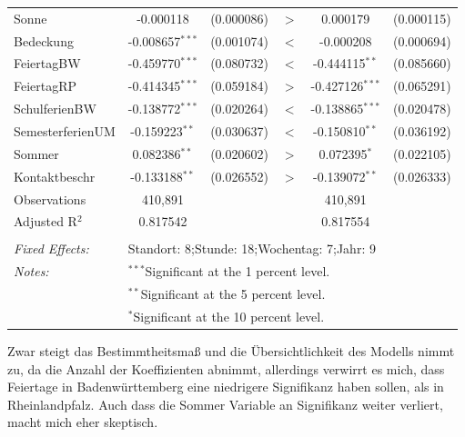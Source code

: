 \documentclass[a4paper,12pt]{thesis}
\begin{document}
\begin{table}[!htbp]
\begin{tabular}{@{\extracolsep{-5pt}}lccccc}
		Sonne & -0.000118 & (0.000086) & $>$ & 0.000179 & (0.000115)\\ 
		
		Bedeckung & -0.008657$^{***}$ & (0.001074) & $<$ & -0.000208 & (0.000694)\\ 
		
		FeiertagBW & -0.459770$^{***}$ & (0.080732) & $<$ & -0.444115$^{**}$ & (0.085660)\\ 
		
		FeiertagRP & -0.414345$^{***}$ & (0.059184) & $>$ & -0.427126$^{***}$ & (0.065291)\\ 
		
		SchulferienBW & -0.138772$^{***}$ & (0.020264) & $<$ & -0.138865$^{***}$ & (0.020478)\\ 
		
		SemesterferienUM & -0.159223$^{**}$ & (0.030637) & $<$ & -0.150810$^{**}$ & (0.036192)\\ 
		
		Sommer & 0.082386$^{**}$ & (0.020602) & $>$ & 0.072395$^{*}$ & (0.022105)\\ 
		
		Kontaktbeschr & -0.133188$^{**}$ & (0.026552) & $>$ & -0.139072$^{**}$ & (0.026333)\\ 
		
		Observations & 410,891 & & & 410,891 & \\ 
		Adjusted R$^{2}$ & 0.817542 & & & 0.817554 & \\  
		\hline \\[-1.8ex] 
		\textit{Fixed Effects:} & \multicolumn{5}{l}{Standort: 8;Stunde: 18;Wochentag: 7;Jahr: 9} \\ 
		\textit{Notes:} & \multicolumn{5}{l}{$^{***}$Significant at the 1 percent level.} \\ 
		& \multicolumn{5}{l}{$^{**}$Significant at the 5 percent level.} \\ 
		& \multicolumn{5}{l}{$^{*}$Significant at the 10 percent level.} \\ 
	\end{tabular} 
\end{table} 

Zwar steigt das Bestimmtheitsmaß und die Übersichtlichkeit des Modells nimmt zu, da die Anzahl der Koeffizienten abnimmt, allerdings verwirrt es mich, dass Feiertage in Badenwürttemberg eine niedrigere Signifikanz haben sollen, als in Rheinlandpfalz. Auch dass die Sommer Variable an Signifikanz weiter verliert, macht mich eher skeptisch.
\end{document}
